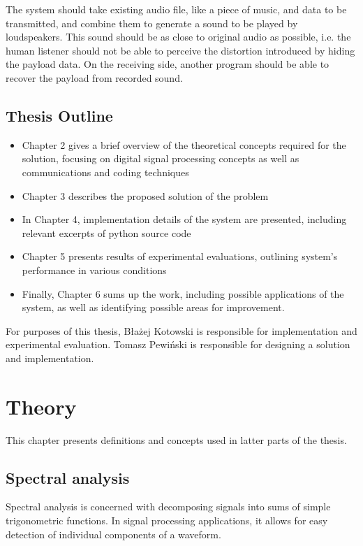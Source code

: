 \documentclass[english,bachelor,a4paper,oneside]{ppfcmthesis}
\begin{document}
The system should take existing audio file, like a piece of music, and data to be transmitted, and combine them to generate a sound to be played by loudspeakers.
This sound should be as close to original audio as possible, i.e. the human listener should not be able to perceive the distortion introduced by hiding the payload data.
On the receiving side, another program should be able to recover the payload from recorded sound.

\section{Thesis Outline}

\begin{itemize}
  \item Chapter 2 gives a brief overview of the theoretical concepts required for the solution, focusing on digital signal processing concepts as well as communications and coding techniques
  \item Chapter 3 describes the proposed solution of the problem
  \item In Chapter 4, implementation details of the system are presented, including relevant excerpts of python source code
  \item Chapter 5 presents results of experimental evaluations, outlining system's performance in various conditions
  \item Finally, Chapter 6 sums up the work, including possible applications of the system, as well as identifying possible areas for improvement.
\end{itemize}

For purposes of this thesis, Błażej Kotowski is responsible for implementation and experimental evaluation. Tomasz Pewiński is responsible for designing a solution and implementation.

\chapter{Theory}

This chapter presents definitions and concepts used in latter parts of the thesis.

\section{Spectral analysis}

Spectral analysis is concerned with decomposing signals into sums of simple trigonometric functions. In signal processing applications, it allows for easy detection of individual components of a waveform.
\end{document}
